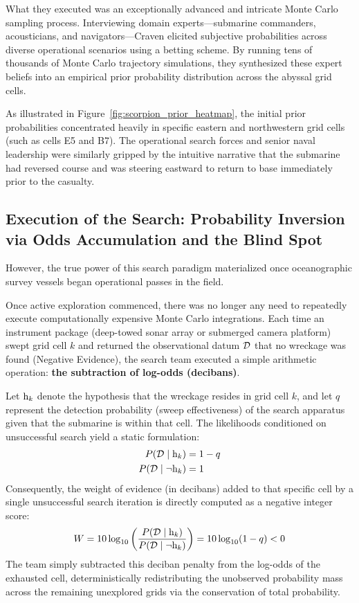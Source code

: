     What they executed was an exceptionally advanced and intricate Monte Carlo sampling process. Interviewing domain experts—submarine commanders, acousticians, and navigators—Craven elicited subjective probabilities across diverse operational scenarios using a betting scheme. By running tens of thousands of Monte Carlo trajectory simulations, they synthesized these expert beliefs into an empirical prior probability distribution across the abyssal grid cells.

    

    As illustrated in Figure~\ref{fig:scorpion_prior_heatmap}, the initial prior probabilities concentrated heavily in specific eastern and northwestern grid cells (such as cells E5 and B7). The operational search forces and senior naval leadership were similarly gripped by the intuitive narrative that the submarine had reversed course and was steering eastward to return to base immediately prior to the casualty.

    \subsection{Execution of the Search: Probability Inversion via Odds Accumulation and the Blind Spot}

    However, the true power of this search paradigm materialized once oceanographic survey vessels began operational passes in the field.

    Once active exploration commenced, there was no longer any need to repeatedly execute computationally expensive Monte Carlo integrations. Each time an instrument package (deep-towed sonar array or submerged camera platform) swept grid cell $k$ and returned the observational datum $\mathcal{D}$ that no wreckage was found (Negative Evidence), the search team executed a simple arithmetic operation: \textbf{the subtraction of log-odds (decibans)}.

    Let $\mathrm{h}_k$ denote the hypothesis that the wreckage resides in grid cell $k$, and let $q$ represent the detection probability (sweep effectiveness) of the search apparatus given that the submarine is within that cell. The likelihoods conditioned on unsuccessful search yield a static formulation:
    \begin{align}
        P(\mathcal{D} \mid \mathrm{h}_k) &= 1 - q \\
        P(\mathcal{D} \mid \neg \mathrm{h}_k) &= 1
    \end{align}
    Consequently, the weight of evidence (in decibans) added to that specific cell by a single unsuccessful search iteration is directly computed as a negative integer score:
    \begin{equation}
        W = 10 \log_{10}\left( \frac{P(\mathcal{D} \mid \mathrm{h}_k)}{P(\mathcal{D} \mid \neg \mathrm{h}_k)} \right) = 10 \log_{10}(1 - q) < 0
    \end{equation}
    The team simply subtracted this deciban penalty from the log-odds of the exhausted cell, deterministically redistributing the unobserved probability mass across the remaining unexplored grids via the conservation of total probability.

